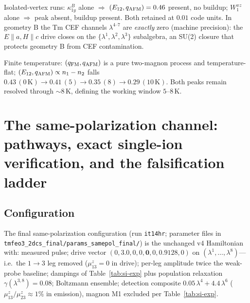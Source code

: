 \documentclass[11pt]{article}
\newcommand{\qafm}{q_{\rm AFM}}
\newcommand{\qfm}{q_{\rm FM}}
\begin{document}
Isolated-vertex runs: $\kappa^B_{1y}$ alone $\Rightarrow$
$(E_{12},\qafm)=0.46$ present, no buildup; $W^{xz}_1$ alone
$\Rightarrow$ peak absent, buildup present.  Both retained at $0.01$
code units.  In geometry B the Tm CEF channels $\lambda^{4\text{--}7}$
are \emph{exactly} zero (machine precision): the
$E\!\parallel\!a,H\!\parallel\!c$ drive closes on the
$\{\lambda^1,\lambda^2,\lambda^3\}$ subalgebra, an SU(2) closure that
protects geometry B from CEF contamination.

Finite temperature: $(\qfm,\qafm)$ is a pure two-magnon process and
temperature-flat; $(E_{12},\qafm)\propto n_1-n_2$ falls
$0.43\,(0\,\mathrm K)\to0.41\,(5)\to0.35\,(8)\to0.29\,(10\,\mathrm K)$.
Both peaks remain resolved through $\sim8$\,K, defining the working
window $5$--$8$\,K.

\section{The same-polarization channel: pathways, exact single-ion
verification, and the falsification ladder}
\label{si:samepol}

\subsection{Configuration}
The final same-polarization configuration (run \texttt{it14hr};
parameter files in
\texttt{tmfeo3\_2dcs\_final/params\_samepol\_final/}) is the unchanged
v4 Hamiltonian with: measured pulse; drive vector
$(0,3.0,0,0,\mathbf{0},0,0.9128,0)$ on
$(\lambda^1,\dots,\lambda^8)$---i.e.\ the $1\!\to\!3$ leg removed
($\mu^z_{13}=0$ in drive); per-leg amplitude twice the weak-probe
baseline; dampings of Table~\ref{tab:si-exp} plus population relaxation
$\gamma(\lambda^{3,8})=0.08$; Boltzmann ensemble; detection composite
$0.05\,\lambda^4+4.4\,\lambda^6$ ($\mu^z_{13}/\mu^z_{23}\approx1\%$ in
emission), magnon M1 excluded per Table~\ref{tab:si-exp}.
\end{document}
